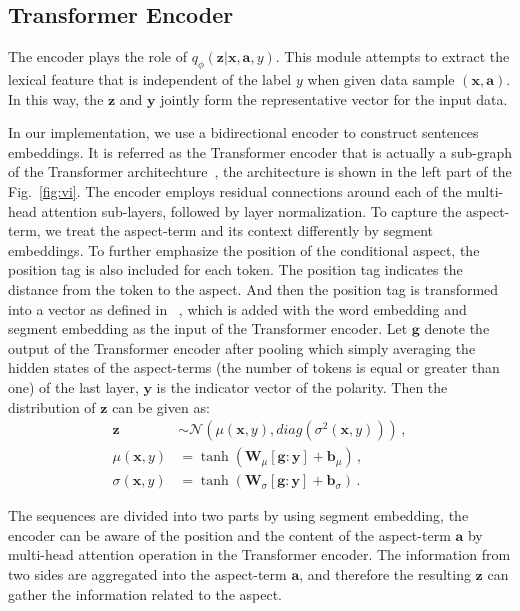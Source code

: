 \documentclass[11pt,a4paper]{article}
\begin{document}
\subsection{Transformer Encoder}
The encoder plays the role of $q_{\phi}(\mathbf{z}|\mathbf{x},\mathbf{a},y)$.
This module attempts to extract the lexical feature that is independent of the label $y$ when given data sample $(\mathbf{x}, \mathbf{a})$.
In this way, the $\mathbf{z}$ and $\mathbf{y}$ jointly form the representative vector for the input data.








In our implementation, we use a bidirectional encoder to construct sentences embeddings. It is referred as the Transformer encoder that is actually a sub-graph of the Transformer architechture~\cite{DBLP:conf/nips/VaswaniSPUJGKP17}, the architecture is shown in the left part of the Fig.~\ref{fig:vi}. The encoder employs residual connections
around each of the multi-head attention sub-layers, followed by layer normalization. To capture the aspect-term, we treat the aspect-term and its context differently by segment embeddings. To further emphasize the position of the conditional aspect, the position tag is also included for each token.
The position tag indicates the distance from the token to the aspect.
And then the position tag is transformed into a vector as defined in ~\cite{DBLP:conf/nips/VaswaniSPUJGKP17}, which is added with the word embedding and segment embedding as the input of the Transformer encoder.
Let $\mathbf{g}$ denote the output of the Transformer encoder after pooling which simply averaging the hidden states of the aspect-terms (the number of tokens is equal or greater than one) of the last layer, $\mathbf{y}$ is the indicator vector of the polarity. Then the distribution of $\mathbf{z}$ can be given as:
\begin{align}
	\mathbf{z} & \sim \mathcal{N}(\mu(\mathbf{x},y), diag(\sigma^2(\mathbf{x},y)))\,, \nonumber\\
\mu(\mathbf{x},y) &= \tanh(\mathbf{W}_\mu [\mathbf{g}:\mathbf{y}] + \mathbf{b}_\mu) \,,\nonumber\\
	\sigma(\mathbf{x},y) &= \tanh(\mathbf{W}_\sigma [\mathbf{g}:\mathbf{y}] + \mathbf{b}_\sigma) \,.\nonumber
\end{align}

The sequences are divided into two parts by using segment embedding, the encoder can be aware of the position and the content of the aspect-term $\mathbf{a}$ by multi-head attention operation in the Transformer encoder.
The information from two sides are aggregated into the aspect-term $\mathbf{a}$, and therefore the resulting $\mathbf{z}$ can gather the information related to the aspect.
\end{document}
